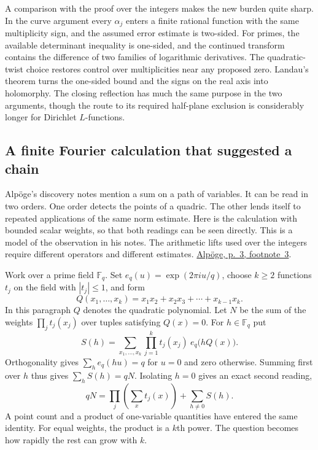 \documentclass[11pt,letterpaper]{article}
\begin{document}
A comparison with the proof over the integers makes the new burden quite sharp. In the curve argument every \(\alpha_j\) enters a finite rational function with the same multiplicity sign, and the assumed error estimate is two-sided. For primes, the available determinant inequality is one-sided, and the continued transform contains the difference of two families of logarithmic derivatives. The quadratic-twist choice restores control over multiplicities near any proposed zero. Landau's theorem turns the one-sided bound and the signs on the real axis into holomorphy. The closing reflection has much the same purpose in the two arguments, though the route to its required half-plane exclusion is considerably longer for Dirichlet \(L\)-functions.


\subsection{A finite Fourier calculation that suggested a chain}
\label{sec:fourier-path}

Alpöge's discovery notes mention a sum on a path of variables. It can be read in two orders. One order detects the points of a quadric. The other lends itself to repeated applications of the same norm estimate. Here is the calculation with bounded scalar weights, so that both readings can be seen directly. This is a model of the observation in his notes. The arithmetic lifts used over the integers require different operators and different estimates. \href{https://alpo.ge/remark.pdf}{Alpöge, p.~3, footnote~3}.

Work over a prime field \(\mathbb F_q\). Set \(e_q(u)=\exp(2\pi i u/q)\), choose \(k\ge2\) functions \(t_j\) on the field with \(|t_j|\le1\), and form
\[
 Q(x_1,\ldots,x_k)=x_1x_2+x_2x_3+\cdots+x_{k-1}x_k.
\]
In this paragraph \(Q\) denotes the quadratic polynomial. Let \(N\) be the sum of the weights \(\prod_jt_j(x_j)\) over tuples satisfying \(Q(x)=0\). For \(h\in\mathbb F_q\) put
\[
 S(h)=\sum_{x_1,\ldots,x_k}\prod_{j=1}^k t_j(x_j)\ e_q\bigl(hQ(x)\bigr).
\]
Orthogonality gives \(\sum_h e_q(hu)=q\) for \(u=0\) and zero otherwise. Summing first over \(h\) thus gives \(\sum_h S(h)=qN\). Isolating \(h=0\) gives an exact second reading,
\[
 qN=\prod_j\left(\sum_x t_j(x)\right)+\sum_{h\ne0} S(h).
\]
A point count and a product of one-variable quantities have entered the same identity. For equal weights, the product is a \(k\)th power. The question becomes how rapidly the rest can grow with \(k\).
\end{document}
